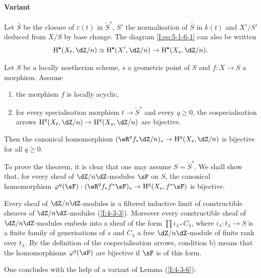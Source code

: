 \paragraph{Variant}
Let $\bar S$ be the closure of $\varepsilon(t)$ in $\widetilde S^s$, $S'$ the
normalisation of $\bar S$ in $k(t)$ and $X'/S'$ deduced from $X/S$ by base
change. The diagram \eqref{I:eq:5-1-6-1} can also be written
\[
  \h^\bullet(X_t,\dZ/n) \simeq \h^\bullet(X',\dZ/n) \to \h^\bullet(X_s,\dZ/n) \text{.}
\]





\begin{theorem}\label{I:5-1-7}
Let $S$ be a locally noetherian scheme, $s$ a geometric point of
$S$ and $f:X\to S$ a morphism. Assume
\begin{enumerate}[\indent a)]
  \item the morphism $f$ is locally acyclic,
  \item for every specialisation morphism $t\to \widetilde S^s$ and every
    $q\geqslant 0$, the cospecialisation arrows
    $\h^q(X_t,\dZ/n) \to \h^q(X_s,\dZ/n)$ are bijective.
\end{enumerate}

Then the canonical homomorphism $(\eR^q f_*\dZ/n)_s\to \h^q(X_s,\dZ/n)$ is
bijective for all $q\geqslant 0$.
\end{theorem}

To prove the theorem, it is clear that one may assume
$S=\widetilde S^s$. We shall show that, for every sheaf of
$\dZ/n\dZ$-modules $\sF$ on $S$, the canonical homomorphism
$\varphi^q(\sF):(\eR^q f_* f^* \sF)_s \to \h^q(X_s,f^*\sF)$ is bijective.

Every sheaf of $\dZ/n\dZ$-modules is a filtered inductive limit of
constructible sheaves of $\dZ/n\dZ$-modules (\ref{I:4-3-3}). Moreover every
constructible sheaf of $\dZ/n\dZ$-modules embeds into a sheaf of the form
$\prod i_{\lambda *} C_\lambda$, where $i_\lambda:t_\lambda\to S$ is a
finite family of generisations of $s$ and $C_\lambda$ a free
$\dZ/n\dZ$-module of finite rank over $t_\lambda$. By the definition of the
cospecialisation arrows, condition b) means that the homomorphisms
$\varphi^q(\sF)$ are bijective if $\sF$ is of this form.

One concludes with the help of a variant of Lemma (\ref{I:4-3-6}):






